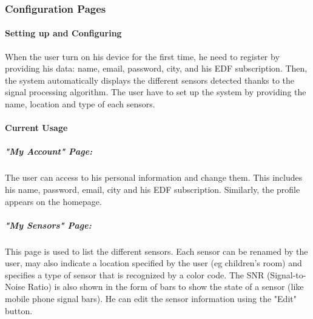 \subsubsection{Configuration Pages}
    
    \paragraph{Setting up and Configuring} %
    
    When the user turn on his device for the first time, he need to register by providing his data: name, email, password, city, and his EDF subscription. Then, the system automatically displays the different sensors detected thanks to the signal processing algorithm. The user have to set up the system by providing the name, location and type of each sensors. %
    
    \paragraph{Current Usage} %
    
    \subparagraph{"My Account" Page:} 
    The user can access to his personal information and change them. This includes his name, password, email, city and his EDF subscription. Similarly, the profile appears on the homepage.
    
    \subparagraph{"My Sensors" Page:}
    This page is used to list the different sensors. Each sensor can be renamed by the user, may also indicate a location specified by the user (eg children's room) and specifies a type of sensor that is recognized by a color code. The SNR (Signal-to-Noise Ratio) is also shown in the form of bars to show the state of a sensor (like mobile phone signal bars). He can edit the sensor information using the "Edit" button.